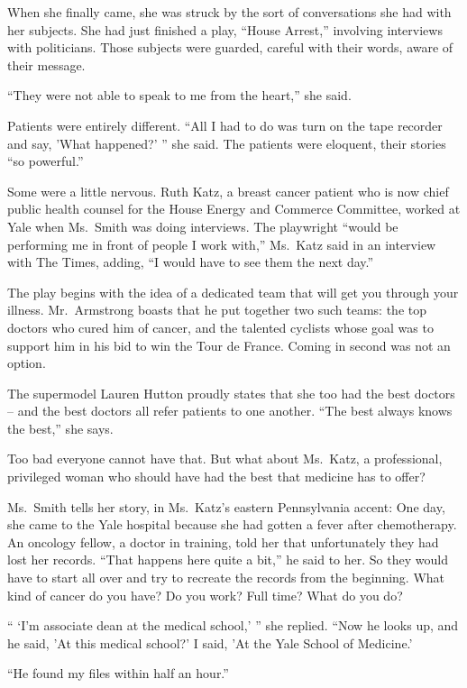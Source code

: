 ﻿\documentclass[12pt]{article}
\begin{document}
When she finally came, she was struck by the sort of conversations she had with her subjects. She
had just finished a play, ``House Arrest,'' involving interviews with politicians. Those subjects
were guarded, careful with their words, aware of their message.

``They were not able to speak to me from the heart,'' she said.

Patients were entirely different. ``All I had to do was turn on the tape recorder and say, 'What
happened?' '' she said. The patients were eloquent, their stories ``so powerful.''

Some were a little nervous. Ruth Katz, a breast cancer patient who is now chief public health
counsel for the House Energy and Commerce Committee, worked at Yale when Ms.~Smith was doing
interviews. The playwright ``would be performing me in front of people I work with,'' Ms.~Katz said
in an interview with The Times, adding, ``I would have to see them the next day.''

The play begins with the idea of a dedicated team that will get you through your illness.
Mr.~Armstrong boasts that he put together two such teams: the top doctors who cured him of cancer,
and the talented cyclists whose goal was to support him in his bid to win the Tour de France. Coming
in second was not an option.

The supermodel Lauren Hutton proudly states that she too had the best doctors -- and the best
doctors all refer patients to one another. ``The best always knows the best,'' she says.

Too bad everyone cannot have that. But what about Ms.~Katz, a professional, privileged woman who
should have had the best that medicine has to offer?

Ms.~Smith tells her story, in Ms.~Katz's eastern Pennsylvania accent: One day, she came to the Yale
hospital because she had gotten a fever after chemotherapy. An oncology fellow, a doctor in
training, told her that unfortunately they had lost her records. ``That happens here quite a bit,''
he said to her. So they would have to start all over and try to recreate the records from the
beginning. What kind of cancer do you have? Do you work? Full time? What do you do?

`` `I'm associate dean at the medical school,' '' she replied. ``Now he looks up, and he said, 'At
this medical school?' I said, 'At the Yale School of Medicine.'

``He found my files within half an hour.''
\end{document}
